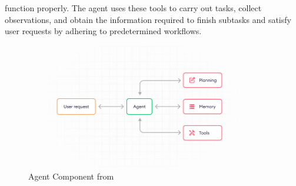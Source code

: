 function properly. The agent uses these tools to carry out tasks, collect observations, and obtain the information required to finish subtasks and satisfy user requests by adhering to predetermined workflows.
    \cite{SuperAnnotate}
    \begin{figure}[H]
        \centering
        \includegraphics[width=10cm]{chapters/2/figures/agent.png}
        \caption[Agent Component]{Agent Component  from~\cite{SuperAnnotate}}
        \label{fig:agent-component}
    \end{figure}

